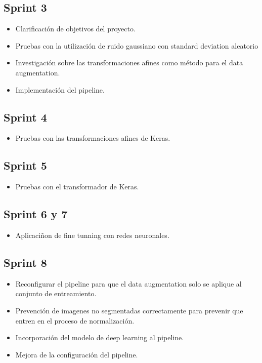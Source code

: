 \subsection{Sprint 3}

\begin{itemize}
\item Clarificación de objetivos del proyecto.
\item Pruebas con la utilización de ruido gaussiano con standard deviation aleatorio
\item Investigación sobre las transformaciones afines como método para el data augmentation.
\item Implementación del pipeline.
\end{itemize}

\subsection{Sprint 4}

\begin{itemize}
\item Pruebas con las transformaciones afines de Keras.
\end{itemize}

\subsection{Sprint 5}

\begin{itemize}
\item Pruebas con el transformador de Keras.
\end{itemize}

\subsection{Sprint 6 y 7}

\begin{itemize}
\item Aplicaciñon de fine tunning con redes neuronales.
\end{itemize}

\subsection{Sprint 8}

\begin{itemize}
\item Reconfigurar el pipeline para que el data augmentation solo se aplique al conjunto de entreamiento.
\item Prevención de imagenes no segmentadas correctamente para prevenir que entren en el proceso de normalización.
\item Incorporación del modelo de deep learning al pipeline.
\item Mejora de la configuración del pipeline.
\end{itemize}

